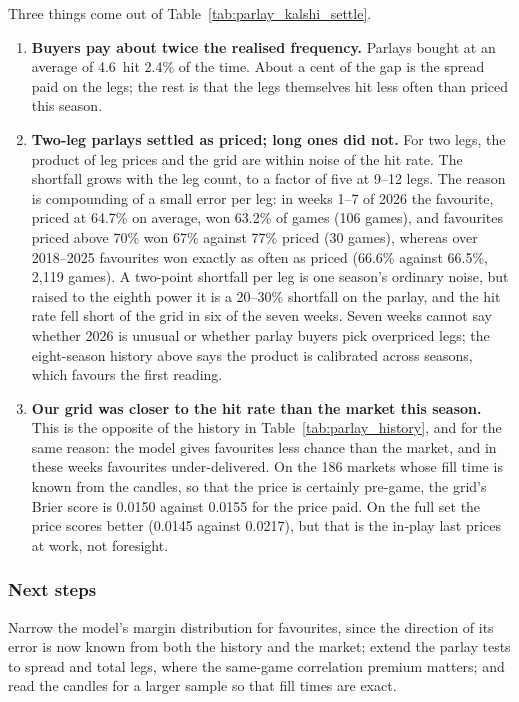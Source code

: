 Three things come out of Table~\ref{tab:parlay_kalshi_settle}.
\begin{enumerate}[nosep]
\item \textbf{Buyers pay about twice the realised frequency.} Parlays bought at an average of 4.6\textcent\ hit 2.4\% of the time. About a cent of the gap is the spread paid on the legs; the rest is that the legs themselves hit less often than priced this season.
\item \textbf{Two-leg parlays settled as priced; long ones did not.} For two legs, the product of leg prices and the grid are within noise of the hit rate. The shortfall grows with the leg count, to a factor of five at 9--12 legs. The reason is compounding of a small error per leg: in weeks 1--7 of 2026 the favourite, priced at 64.7\% on average, won 63.2\% of games (106 games), and favourites priced above 70\% won 67\% against 77\% priced (30 games), whereas over 2018--2025 favourites won exactly as often as priced (66.6\% against 66.5\%, 2,119 games). A two-point shortfall per leg is one season's ordinary noise, but raised to the eighth power it is a 20--30\% shortfall on the parlay, and the hit rate fell short of the grid in six of the seven weeks. Seven weeks cannot say whether 2026 is unusual or whether parlay buyers pick overpriced legs; the eight-season history above says the product is calibrated across seasons, which favours the first reading.
\item \textbf{Our grid was closer to the hit rate than the market this season.} This is the opposite of the history in Table~\ref{tab:parlay_history}, and for the same reason: the model gives favourites less chance than the market, and in these weeks favourites under-delivered. On the 186 markets whose fill time is known from the candles, so that the price is certainly pre-game, the grid's Brier score is 0.0150 against 0.0155 for the price paid. On the full set the price scores better (0.0145 against 0.0217), but that is the in-play last prices at work, not foresight.
\end{enumerate}

\subsubsection{Next steps}

Narrow the model's margin distribution for favourites, since the direction of its error is now known from both the history and the market; extend the parlay tests to spread and total legs, where the same-game correlation premium matters; and read the candles for a larger sample so that fill times are exact.
